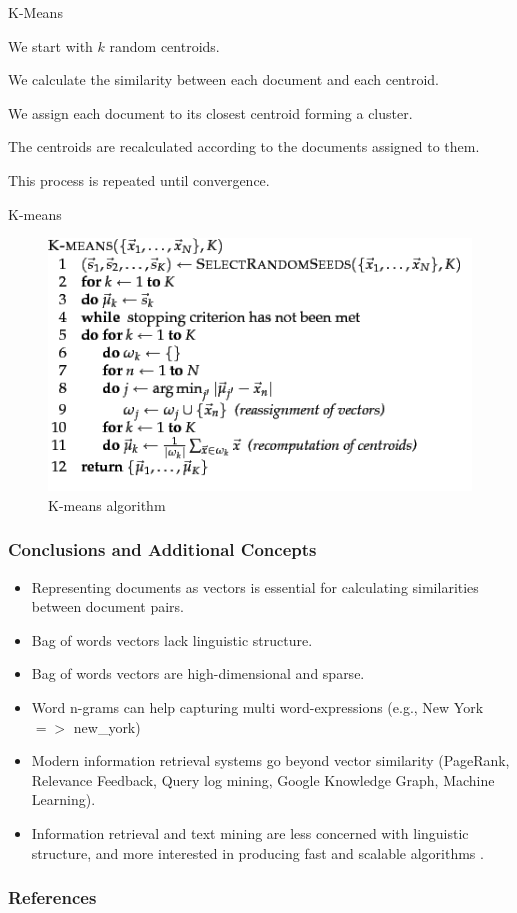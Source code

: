 \documentclass[handout]{beamer}
\begin{document}
\begin{frame}{K-Means}
\footnotesize{
    \begin{enumerate}
    \footnotesize{
    \item We start with $k$ random centroids.
    \item We calculate the similarity between each document and each centroid.
    \item We assign each document to its closest centroid forming a cluster.
    \item The centroids are recalculated according to the documents assigned to them.
    \item This process is repeated until convergence.}
    \end{enumerate}

}
\end{frame}


\begin{frame}{K-means}
\begin{figure}[h!]
	\centering
	\includegraphics[scale=0.6]{pics/kmeans.png}
	\caption{ K-means algorithm}
\end{figure}

 
\end{frame}

\begin{frame}\frametitle{Conclusions and Additional Concepts}
\footnotesize{
\begin{itemize}
 \item Representing documents as vectors is essential for calculating similarities between document pairs.
 \item Bag of words vectors lack linguistic structure.
 \item Bag of words vectors are high-dimensional and sparse. 
 \item Word n-grams can help capturing multi word-expressions (e.g., New York $=>$ new\_york)
 \item Modern information retrieval systems go beyond vector similarity (PageRank, Relevance Feedback, Query log mining, Google Knowledge Graph, Machine Learning).
 \item Information retrieval and text mining are less concerned with linguistic structure, and more interested in producing fast and scalable algorithms \cite{jacobbook}. 
\end{itemize}


}
\end{frame}



\begin{frame}[allowframebreaks]\scriptsize
\frametitle{References}


%
\end{frame}



\end{document}
